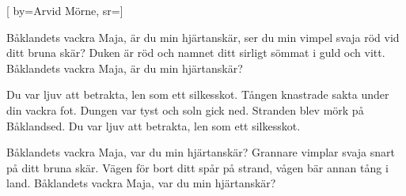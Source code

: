 


[ 	%
	by={Arvid Mörne},	%
	sr={}]		%
	
\beginverse*		%
Båklandets vackra Maja,
är du min hjärtanskär,
ser du min vimpel svaja
röd vid ditt bruna skär?
Duken är röd och namnet ditt
sirligt sömmat i guld och vitt.
Båklandets vackra Maja,
är du min hjärtanskär?
\endverse			%

\beginverse*		%
Du var ljuv att betrakta,
len som ett silkesskot.
Tången knastrade sakta 
under din vackra fot.
Dungen var tyst och soln gick ned.
Stranden blev mörk på Båklandsed.
Du var ljuv att betrakta,
len som ett silkesskot.
\endverse			%

\beginverse*		%
Båklandets vackra Maja,
var du min hjärtanskär?
Grannare vimplar svaja
snart på ditt bruna skär.
Vägen för bort ditt spår på strand,
vågen bär annan tång i land.
Båklandets vackra Maja,
var du min hjärtanskär?
\endverse			%
\endsong			%
